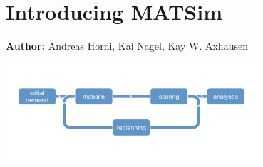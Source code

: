 \chapter{Introducing MATSim}
\label{ch:introducing}
\hfill \textbf{Author:} Andreas Horni, Kai Nagel, Kay W. Axhausen

\begin{center} \includegraphics[width=0.7\textwidth, angle=0]{figures/matsimcycle.pdf} \end{center}



